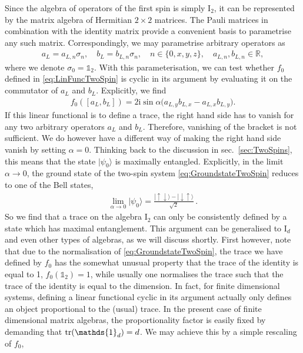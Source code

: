 \documentclass[a4paper,11pt]{article}
\renewcommand{\i}{\text{i}}
\newcommand{\1}{\mathds{1}}
\begin{document}
Since the algebra of operators of the first spin is simply I$_2$, it can be represented by the matrix algebra of Hermitian $2\times2$ matrices. The Pauli matrices in combination with the identity matrix provide a convenient basis to parametrise any such matrix. Correspondingly, we may parametrise arbitrary operators as
\begin{align}
    a_L=a_{L,n}\sigma_n,\quad b_L=b_{L,n}\sigma_n,\quad n\in\{0,x,y,z\},\quad a_{L,n},b_{L,n}\in\mathds{R},\label{eq:SingleSpinOperators}
\end{align}
where we denote $\sigma_0=\1_2$. With this parameterisation, we can test whether $f_0$ defined in \eqref{eq:LinFuncTwoSpin} is cyclic in its argument by evaluating it on the commutator of $a_L$ and $b_L$. Explicitly, we find
\begin{align}
    f_0([a_L,b_L])=2\i\sin\alpha\big(a_{L,y}b_{L,x}-a_{L,x}b_{L,y}\big).\label{eq:TwoSpinPreTrace}
\end{align}
If this linear functional is to define a trace, the right hand side has to vanish for any two arbitrary operators $a_L$ and $b_L$. Therefore, vanishing of the bracket is not sufficient. We do however have a different way of making the right hand side vanish by setting $\alpha=0$. Thinking back to the discussion in sec.~\ref{sec:TwoSpins}, this means that the state $|\psi_0\rangle$ is maximally entangled. Explicitly, in the limit $\alpha\to 0$, the ground state of the two-spin system \eqref{eq:GroundstateTwoSpin} reduces to one of the Bell states,
\begin{align}
    \lim\limits_{\alpha\to0}|\psi_0\rangle=\frac{|\!\uparrow\downarrow\rangle-|\!\downarrow\uparrow\rangle}{\sqrt{2}}\,.
\end{align}
So we find that a trace on the algebra I$_2$ can only be consistently defined by a state which has maximal entanglement. This argument can be generalised to I$_d$ and even other types of algebras, as we will discuss shortly. First however, note that due to the normalisation of \eqref{eq:GroundstateTwoSpin}, the trace we have defined by $f_0$ has the somewhat unusual property that the trace of the identity is equal to 1, $f_0(\1_2)=1$, while usually one normalises the trace such that the trace of the identity is equal to the dimension. In fact, for finite dimensional systems, defining a linear functional cyclic in its argument actually only defines an object proportional to the (usual) trace. In the present case of finite dimensional matrix algebras, the proportionality factor is easily fixed by demanding that $\tr(\1_d)=d$. We may achieve this by a simple rescaling of $f_0$,
\end{document}
